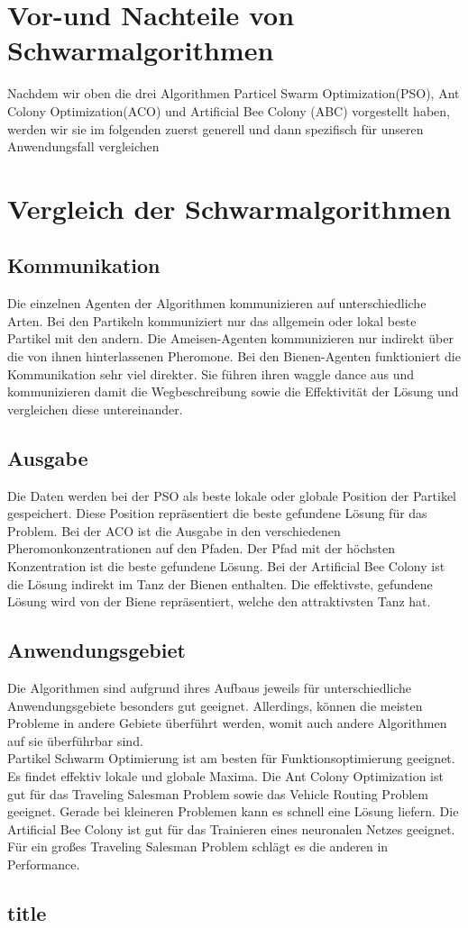 \documentclass{article}
\begin{document}
\section*{Vor-und Nachteile von Schwarmalgorithmen}



Nachdem wir oben die drei Algorithmen Particel Swarm Optimization(PSO), Ant Colony Optimization(ACO) und  Artificial Bee Colony (ABC) vorgestellt haben, werden wir sie im folgenden zuerst generell und dann spezifisch für unseren Anwendungsfall vergleichen\\

\section*{Vergleich der Schwarmalgorithmen}

\subsection*{Kommunikation}
Die einzelnen Agenten der Algorithmen kommunizieren auf unterschiedliche Arten. Bei den Partikeln kommuniziert nur das allgemein oder lokal beste Partikel mit den andern. 
Die Ameisen-Agenten kommunizieren nur indirekt über die von ihnen hinterlassenen Pheromone. Bei den Bienen-Agenten funktioniert die Kommunikation sehr viel direkter.
Sie führen ihren waggle dance aus und kommunizieren damit die Wegbeschreibung sowie die Effektivität der Lösung und vergleichen diese untereinander.

\subsection*{Ausgabe}
Die Daten werden bei der PSO als beste lokale oder globale Position der Partikel gespeichert. Diese Position repräsentiert die beste gefundene Lösung für das Problem.
Bei der ACO ist die Ausgabe in den verschiedenen Pheromonkonzentrationen auf den Pfaden. Der Pfad mit der höchsten Konzentration ist die beste gefundene Lösung.
Bei der Artificial Bee Colony ist die Lösung indirekt im Tanz der Bienen enthalten. Die effektivste, gefundene Lösung wird von der Biene repräsentiert, welche den attraktivsten Tanz hat.

\subsection*{Anwendungsgebiet}
Die Algorithmen sind aufgrund ihres Aufbaus jeweils für unterschiedliche Anwendungsgebiete besonders gut geeignet. Allerdings, können die meisten Probleme in andere Gebiete überführt werden, womit auch andere Algorithmen auf sie überführbar sind.\\
Partikel Schwarm Optimierung ist am besten für Funktionsoptimierung geeignet. Es findet effektiv lokale und globale Maxima.
Die Ant Colony Optimization ist gut für das Traveling Salesman Problem sowie das Vehicle Routing Problem geeignet. Gerade bei kleineren Problemen kann es schnell eine Lösung liefern\cite{sabet2016comparison}.
Die Artificial Bee Colony ist gut für das Trainieren eines neuronalen Netzes geeignet. Für ein großes Traveling Salesman Problem schlägt es die anderen in Performance\cite{sabet2016comparison}.

\subsection*{title}
\end{document}
